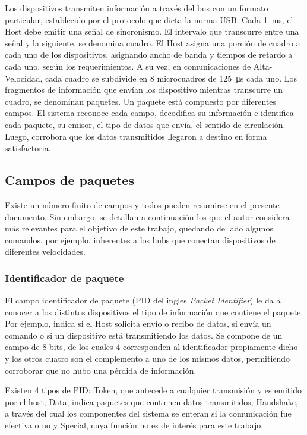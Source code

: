 Los dispositivos transmiten información a través del bus con un formato particular, establecido por el protocolo que dicta la norma USB. Cada \SI{1}{\milli\second}, el Host debe emitir una señal de sincronismo. El intervalo que transcurre entre una señal y la siguiente, se denomina cuadro. El Host asigna una porción de cuadro a cada uno de los dispositivos, asignando ancho de banda y tiempos de retardo a cada uno, según los requerimientos. A su vez, en comunicaciones de Alta-Velocidad, cada cuadro se subdivide en 8 microcuadros de \SI{125}{\micro\second} cada uno. Los fragmentos de información que envían los dispositivo mientras transcurre un cuadro, se denominan paquetes. Un paquete está compuesto por diferentes campos. El sistema reconoce cada campo, decodifica su información e identifica cada paquete, su emisor, el tipo de datos que envía, el sentido de circulación. Luego, corrobora que los datos transmitidos llegaron a destino en forma satisfactoria. 

\subsection{Campos de paquetes}
	Existe un número finito de campos y todos pueden resumirse en el presente documento. Sin embargo, se detallan a continuación los que el autor considera más relevantes para el objetivo de este trabajo, quedando de lado algunos comandos, por ejemplo, inherentes a los hubs que conectan dispositivos de diferentes velocidades.

	\subsubsection*{Identificador de paquete}
		El campo identificador de paquete (PID del ingles {\it Packet Identifier}) le da a conocer a los distintos dispositivos el tipo de información que contiene el paquete. Por ejemplo, indica si el Host solicita envío o recibo de datos, si envía un comando o si un dispositivo está transmitiendo los datos. Se compone de un campo de 8 bits, de los cuales 4 corresponden al identificador propiamente dicho y los otros cuatro son el complemento a uno de los mismos datos, permitiendo corroborar que no hubo una pérdida de información.%
		
		Existen 4 tipos de PID: Token, que antecede a cualquier transmisión y es emitido por el host; Data, indica paquetes que contienen datos transmitidos; Handshake, a través del cual los componentes del sistema se enteran si la comunicación fue efectiva o no y Special, cuya función no es de interés para este trabajo.%
	
